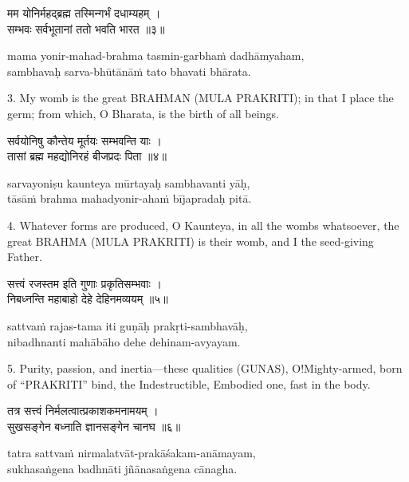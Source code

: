 \begin{gitaverse}
मम योनिर्महद्ब्रह्म तस्मिन्गर्भं दधाम्यहम् । \\
सम्भवः सर्वभूतानां ततो भवति भारत ॥३॥
\end{gitaverse}

\begin{transliteration}
mama yonir-mahad-brahma tasmin-garbhaṁ dadhāmyaham, \\
sambhavaḥ sarva-bhūtānāṁ tato bhavati bhārata.
\end{transliteration}

3. My womb is the great BRAHMAN (MULA PRAKRITI); in that I place the germ; from
which, O Bharata, is the birth of all beings.

\begin{gitaverse}
सर्वयोनिषु कौन्तेय मूर्तयः सम्भवन्ति याः । \\
तासां ब्रह्म महद्योनिरहं बीजप्रदः पिता ॥४॥
\end{gitaverse}

\begin{transliteration}
sarvayoniṣu kaunteya mūrtayaḥ sambhavanti yāḥ, \\
tāsāṁ brahma mahadyonir-ahaṁ bījapradaḥ pitā.
\end{transliteration}

4. Whatever forms are produced, O Kaunteya, in all the wombs whatsoever, the
great BRAHMA (MULA PRAKRITI) is their womb, and I the seed-giving Father.

\begin{gitaverse}
सत्त्वं रजस्तम इति गुणाः प्रकृतिसम्भवाः । \\
निबध्नन्ति महाबाहो देहे देहिनमव्ययम् ॥५॥
\end{gitaverse}

\begin{transliteration}
sattvaṁ rajas-tama iti guṇāḥ prakṛti-sambhavāḥ, \\
nibadhnanti mahābāho dehe dehinam-avyayam.
\end{transliteration}

5. Purity, passion, and inertia---these qualities (GUNAS), O!\@ Mighty-armed,
born of ``PRAKRITI'' bind, the Indestructible, Embodied one, fast in the body.

\begin{gitaverse}
तत्र सत्त्वं निर्मलत्वात्प्रकाशकमनामयम् । \\
सुखसङ्गेन बध्नाति ज्ञानसङ्गेन चानघ ॥६॥
\end{gitaverse}

\begin{transliteration}
tatra sattvaṁ nirmalatvāt-prakāśakam-anāmayam, \\
sukhasaṅgena badhnāti jñānasaṅgena cānagha.
\end{transliteration}

